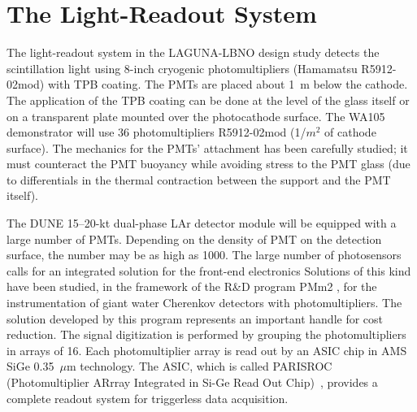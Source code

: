 \section{The Light-Readout System} 
\label{sec:detectors-fd-alt-light}

The light-readout system 
in the LAGUNA-LBNO design study %
 detects the scintillation light using 8-inch cryogenic
photomultipliers (Hamamatsu R5912-02mod) with TPB coating. The PMTs
are placed about 1~m below the cathode. %
The application of
the TPB coating can be done at the level of the glass itself or on a
transparent plate mounted over the photocathode surface. The WA105
demonstrator will use 36 photomultipliers R5912-02mod (1/$m^2$ of
cathode surface). The mechanics for the PMTs' attachment %
has been
carefully studied; it must counteract the PMT buoyancy while avoiding
stress to the PMT glass (due to differentials
 in the thermal contraction between the support and the PMT
itself).

The DUNE 15--20-kt dual-phase LAr detector module will be equipped with a
large number of PMTs. Depending on the density of PMT on the
detection surface, %
the number may be as high as 1000.
The large number of photosensors calls for an integrated
solution for the front-end electronics 
Solutions of this kind have
been studied, in the framework of the R\&D program PMm2 \cite{PMM2-1,
  PMM2-2}, for the instrumentation of giant water Cherenkov detectors
with photomultipliers. The solution developed by this program represents
an important handle for cost reduction.  The signal digitization is
performed by grouping the photomultipliers in arrays of 16. Each
photomultiplier array is read out by an ASIC chip in AMS SiGe
0.35~$\mu$m technology. The ASIC, which is called PARISROC
(Photomultiplier ARrray Integrated in Si-Ge Read Out Chip)~\cite{Parisroc}, provides a complete readout system for triggerless data
acquisition.


